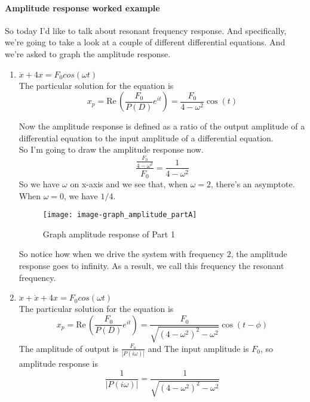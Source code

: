 \paragraph{Amplitude response worked example}
So today I'd like to talk about resonant frequency response.
And specifically, we're going to take
a look at a couple of different differential equations.
And we're asked to graph the amplitude response.
\begin{enumerate}[label=\textbf{Part.\arabic*}]
\item $\ddot x + 4x = F_0 cos (\omega t)$\\
  The particular solution for the equation is
  \begin{equation*}
    x_ p = \mathrm{Re\, }(\frac{F_ 0}{P(D)} e^{it}) = \frac{F_ 0}{4 - \omega ^2 } \cos (t) 
  \end{equation*}
  \clearpage
  
  Now the amplitude response is defined as a ratio of
  the output amplitude of a differential equation to the input amplitude
  of a differential equation.\\
  So I'm going to draw the amplitude response now.
  \begin{equation*}
    \displaystyle \frac{\frac{F_ 0}{4 - \omega ^2}}{F_0}
    \displaystyle= \frac{1}{4 - \omega ^2}
  \end{equation*}
  So we have $\omega$ on x-axis and we see that, when $\omega = 2$,
  there's an asymptote. When $\omega = 0$, we have $1/4$.

  \begin{figure}[ht!]
    \centering
    \texttt{[image: image-graph\_amplitude\_partA]}
    \caption{Graph amplitude response of Part 1}
  \end{figure}
  
  So notice how when we drive the system with frequency $2$,
  the amplitude response goes to infinity.
  As a result, we call this frequency the resonant frequency.
  
\item $\ddot x + \dot x + 4x = F_0 cos (\omega t)$ \\
  The particular solution for the equation is
  \begin{equation*}
    x_ p = \mathrm{Re\, }(\frac{F_ 0}{P(D)} e^{it})
    = \frac{F_ 0}{\sqrt{(4 - \omega ^2)^2 - \omega^2  }} \cos (t - \phi) 
  \end{equation*}
  The amplitude of output is $\displaystyle \frac{F_0}{|P(i\omega)|} $ and
  The input amplitude is $F_0$, so amplitude response is
  \begin{equation*}
    \frac{1}{|P(i\omega)|} = \frac{1}{\sqrt{(4 - \omega ^2)^2 - \omega^2  }}
  \end{equation*}
  \clearpage
  

\end{enumerate}
